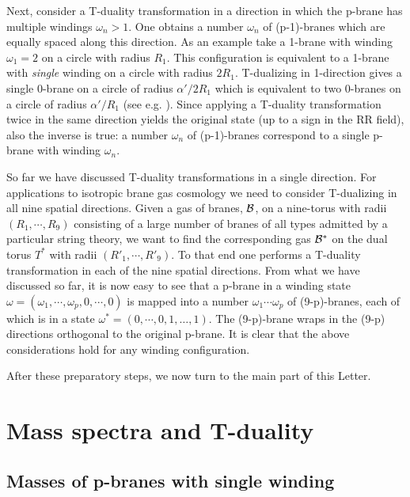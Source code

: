 \documentclass[a4paper,twocolumn,nofootinbib,tightenlines,prd,aps,
               superscriptaddress]{revtex4} %
\newcommand{\al}{\alpha}
\newcommand{\om}{\omega}
\newcommand{\cB}{{\cal{B}}}
\begin{document}
Next, consider a T-duality transformation in a direction in which
the p-brane has multiple windings $\om_n
> 1$. One obtains a number $\om_n$ of (p-1)-branes which are
equally spaced along this direction. As an example take a 1-brane
with winding $\om_1 = 2$ on a circle with radius $R_1$. This
configuration is equivalent to a 1-brane with {\em single} winding
on a circle with radius $2R_1$. T-dualizing in 1-direction gives a
single 0-brane on a circle of radius $\al'/2R_1$ which is
equivalent to two 0-branes  on a circle of radius $\al'/R_1$ (see
e.g. \cite{Hashimoto:1998pd}). Since applying a T-duality
transformation twice in the same direction yields the original
state (up to a sign in the RR field), also the inverse is true: a
number $\om_n$ of (p-1)-branes correspond to a single p-brane with
winding $\om_n$.


So far we have discussed T-duality transformations in a single
direction. For applications to isotropic brane gas cosmology we
need to consider T-dualizing in all nine spatial directions. Given
a gas of branes, $\cB$, on a nine-torus with radii $(R_1, \cdots,
R_9)$ consisting of a large number of branes of all types admitted
by a particular string theory, we want to find the corresponding
gas $\cB^*$  on the dual torus $T^*$ with radii
$(R'_1,\cdots,R'_9)$. To that end one performs a T-duality
transformation in each of the nine spatial directions. From what
we have discussed so far, it is now easy to see that a p-brane in
a winding state $\om=(\om_1,\cdots,\om_p,0,\cdots,0)$ is mapped
into a number $\om_1 \cdots \om_p$ of (9-p)-branes, each of which
is in a state $\om^*=(0,\cdots,0,1,\dots,1)$. The (9-p)-brane
wraps in the (9-p) directions orthogonal to the original p-brane.
It is clear that the above considerations hold for any winding
configuration.

After these preparatory steps, we now turn to the main part of this
Letter.



\section{Mass spectra and T-duality}
\label{sec:spectrum}

\subsection{Masses of p-branes with single winding}
\end{document}
